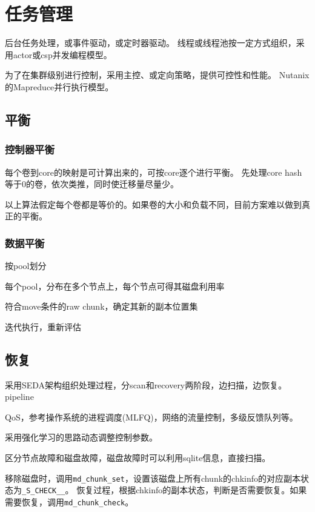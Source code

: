 \chapter{任务管理}

后台任务处理，或事件驱动，或定时器驱动。
线程或线程池按一定方式组织，采用actor或csp并发编程模型。

为了在集群级别进行控制，采用主控、或定向策略，提供可控性和性能。
Nutanix的Mapreduce并行执行模型。

\section{平衡}

\subsection{控制器平衡}

每个卷到core的映射是可计算出来的，可按core逐个进行平衡。
先处理core hash等于0的卷，依次类推，同时使迁移量尽量少。

以上算法假定每个卷都是等价的。如果卷的大小和负载不同，目前方案难以做到真正的平衡。

\subsection{数据平衡}

\begin{enumbox}
\item 按pool划分
\item 每个pool，分布在多个节点上，每个节点可得其磁盘利用率
\item 符合move条件的raw chunk，确定其新的副本位置集
\item 迭代执行，重新评估
\end{enumbox}

\section{恢复}

采用SEDA架构组织处理过程，分scan和recovery两阶段，边扫描，边恢复。
pipeline

QoS，参考操作系统的进程调度(MLFQ)，网络的流量控制，多级反馈队列等。

采用强化学习的思路动态调整控制参数。

区分节点故障和磁盘故障，磁盘故障时可以利用sqlite信息，直接扫描。

移除磁盘时，调用\verb|md_chunk_set|，设置该磁盘上所有chunk的chkinfo的对应副本状态为\verb|_S_CHECK__|。
恢复过程，根据chkinfo的副本状态，判断是否需要恢复。如果需要恢复，调用\verb|md_chunk_check|。

